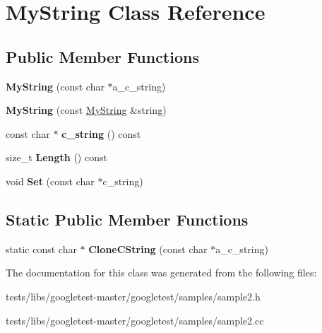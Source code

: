 \hypertarget{classMyString}{}\section{My\+String Class Reference}
\label{classMyString}
\subsection*{Public Member Functions}
\begin{DoxyCompactItemize}
\item 
\mbox{\label{classMyString_a28134eb91b6698f46b12accefa157d0f}} 
{\bfseries My\+String} (const char $\ast$a\+\_\+c\+\_\+string)
\item 
\mbox{\label{classMyString_ae24c7cf89a58dd2287303df2ac054c66}} 
{\bfseries My\+String} (const \hyperlink{classMyString}{My\+String} \&string)
\item 
\mbox{\label{classMyString_aff2af0cf30db39fe24a235670ee6ff25}} 
const char $\ast$ {\bfseries c\+\_\+string} () const
\item 
\mbox{\label{classMyString_a4eb168b1ec401a732b3859abe004d648}} 
size\+\_\+t {\bfseries Length} () const
\item 
\mbox{\label{classMyString_a521c4cd7eccac6ce554d8a51505e4970}} 
void {\bfseries Set} (const char $\ast$c\+\_\+string)
\end{DoxyCompactItemize}
\subsection*{Static Public Member Functions}
\begin{DoxyCompactItemize}
\item 
\mbox{\label{classMyString_a40753dcfa3314a8993f32bdd75d67ce2}} 
static const char $\ast$ {\bfseries Clone\+C\+String} (const char $\ast$a\+\_\+c\+\_\+string)
\end{DoxyCompactItemize}


The documentation for this class was generated from the following files\+:\begin{DoxyCompactItemize}
\item 
tests/libs/googletest-\/master/googletest/samples/sample2.\+h\item 
tests/libs/googletest-\/master/googletest/samples/sample2.\+cc\end{DoxyCompactItemize}
